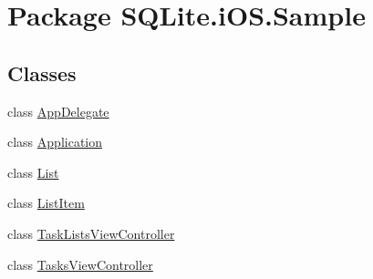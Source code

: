 \hypertarget{namespace_s_q_lite_1_1i_o_s_1_1_sample}{\section{Package S\+Q\+Lite.\+i\+O\+S.\+Sample}
\label{namespace_s_q_lite_1_1i_o_s_1_1_sample}
}
\subsection*{Classes}
\begin{DoxyCompactItemize}
\item 
class \hyperlink{class_s_q_lite_1_1i_o_s_1_1_sample_1_1_app_delegate}{App\+Delegate}
\item 
class \hyperlink{class_s_q_lite_1_1i_o_s_1_1_sample_1_1_application}{Application}
\item 
class \hyperlink{class_s_q_lite_1_1i_o_s_1_1_sample_1_1_list}{List}
\item 
class \hyperlink{class_s_q_lite_1_1i_o_s_1_1_sample_1_1_list_item}{List\+Item}
\item 
class \hyperlink{class_s_q_lite_1_1i_o_s_1_1_sample_1_1_task_lists_view_controller}{Task\+Lists\+View\+Controller}
\item 
class \hyperlink{class_s_q_lite_1_1i_o_s_1_1_sample_1_1_tasks_view_controller}{Tasks\+View\+Controller}
\end{DoxyCompactItemize}
